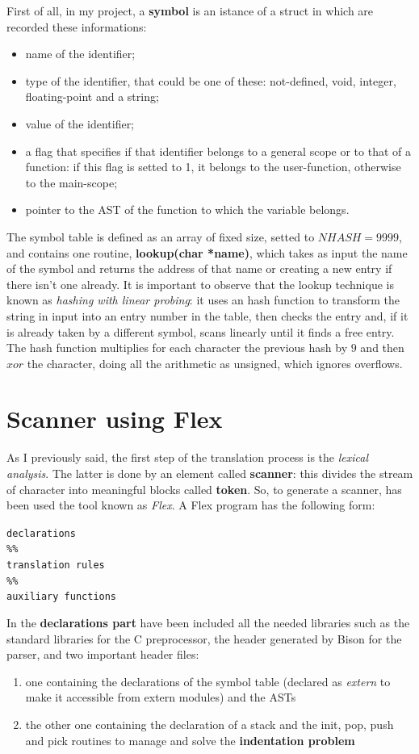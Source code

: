 \documentclass[a4paper,12pt,,titlepage,openright]{report}
\begin{document}
First of all, in my project, a \textbf{symbol} is an istance of a struct in which are recorded these informations:
\begin{itemize}
\item name of the identifier;
\item type of the identifier, that could be one of these: not-defined, void, integer, floating-point and a string;
\item value of the identifier;
\item a flag that specifies if that identifier belongs to a general scope or to that of a function: if this flag is setted to 1, it belongs to the user-function, otherwise to the main-scope;
\item pointer to the AST of the function to which the variable belongs.
\end{itemize}
The symbol table is defined as an array of fixed size, setted to $NHASH = 9999$, and contains one routine, \textbf{lookup(char *name)}, which takes as input the name of the symbol and returns the address of that name or creating a new entry if there isn't one already.
It is important to observe that the lookup technique is known as \textit{hashing with linear probing}: it uses an hash function to transform the string in input into an entry number in the table, then checks the entry and, if it is already taken by a different symbol, scans linearly until it finds a free entry.
The hash function multiplies for each character the previous hash by $9$ and then $xor$ the character, doing all the arithmetic as unsigned, which ignores overflows.

\section{Scanner using Flex}
As I previously said, the first step of the translation process is the \textit{lexical analysis}. The latter is done by an element called \textbf{scanner}: this divides the stream of character into meaningful blocks called \textbf{token}.
So, to generate a scanner, has been used the tool known as \textit{Flex}.
A Flex program has the following form:
\begin{flushleft}
\texttt{declarations
\\
\%\% 
\\translation rules
\\
\%\%
\\auxiliary functions }
\end{flushleft}

In the \textbf{declarations part} have been included all the needed libraries such as the standard libraries for the C preprocessor, the header generated by Bison for the parser, and two important header files:
\begin{enumerate}
\item one containing the declarations of the symbol table (declared as \textit{extern} to make it accessible from extern modules) and the ASTs
\item the other one containing the declaration of a stack and the init, pop, push and pick routines to manage and solve the \textbf{indentation problem}
\end{enumerate}
\end{document}
